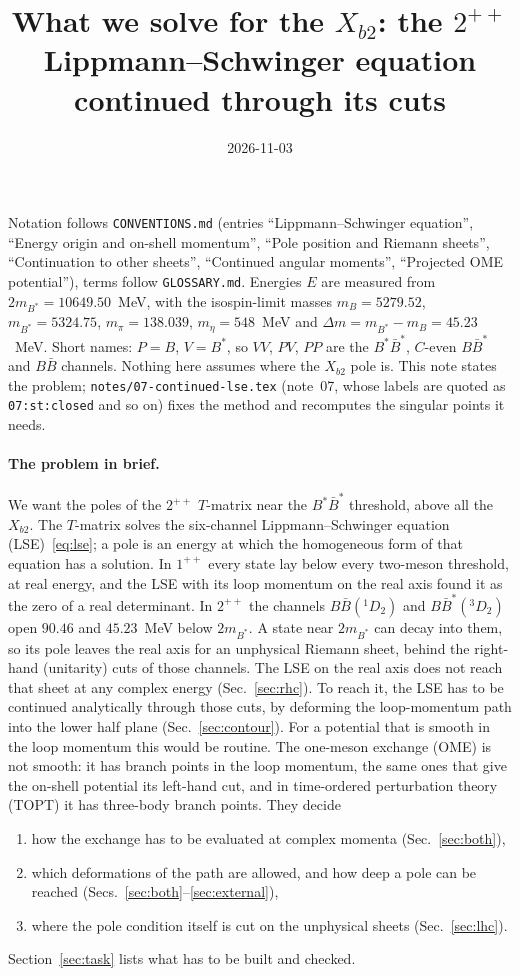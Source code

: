 \documentclass[11pt]{article}
\title{What we solve for the $X_{b2}$: the $2^{++}$ Lippmann--Schwinger equation continued through its cuts}
\author{}
\date{2026-11-03}
\newcommand{\file}[1]{\nolinkurl{#1}}
\begin{document}
\maketitle

\noindent Notation follows \file{CONVENTIONS.md} (entries ``Lippmann--Schwinger equation'', ``Energy origin and on-shell momentum'', ``Pole position and Riemann sheets'', ``Continuation to other sheets'', ``Continued angular moments'', ``Projected OME potential''), terms follow \file{GLOSSARY.md}. Energies $E$ are measured from $2m_{B^*}=10649.50$~MeV, with the isospin-limit masses $m_B=5279.52$, $m_{B^*}=5324.75$, $m_\pi=138.039$, $m_\eta=548$~MeV and $\Delta m=m_{B^*}-m_B=45.23$~MeV. Short names: $P=B$, $V=B^*$, so $VV$, $PV$, $PP$ are the $B^*\bar B^*$, $C$-even $B\bar B^*$ and $B\bar B$ channels. Nothing here assumes where the $X_{b2}$ pole is. This note states the problem; \file{notes/07-continued-lse.tex} (note~07, whose labels are quoted as \texttt{07:st:closed} and so on) fixes the method and recomputes the singular points it needs.

\paragraph{The problem in brief.}
We want the poles of the $2^{++}$ $T$-matrix near the $B^*\bar B^*$ threshold, above all the $X_{b2}$. The $T$-matrix solves the six-channel Lippmann--Schwinger equation (LSE)~\eqref{eq:lse}; a pole is an energy at which the homogeneous form of that equation has a solution. In $1^{++}$ every state lay below every two-meson threshold, at real energy, and the LSE with its loop momentum on the real axis found it as the zero of a real determinant. In $2^{++}$ the channels $B\bar B(^1D_2)$ and $B\bar B^*(^3D_2)$ open $90.46$ and $45.23$~MeV below $2m_{B^*}$. A state near $2m_{B^*}$ can decay into them, so its pole leaves the real axis for an unphysical Riemann sheet, behind the right-hand (unitarity) cuts of those channels. The LSE on the real axis does not reach that sheet at any complex energy (Sec.~\ref{sec:rhc}). To reach it, the LSE has to be continued analytically through those cuts, by deforming the loop-momentum path into the lower half plane (Sec.~\ref{sec:contour}). For a potential that is smooth in the loop momentum this would be routine. The one-meson exchange (OME) is not smooth: it has branch points in the loop momentum, the same ones that give the on-shell potential its left-hand cut, and in time-ordered perturbation theory (TOPT) it has three-body branch points. They decide
\begin{enumerate}
\item how the exchange has to be evaluated at complex momenta (Sec.~\ref{sec:both}),
\item which deformations of the path are allowed, and how deep a pole can be reached (Secs.~\ref{sec:both}--\ref{sec:external}),
\item where the pole condition itself is cut on the unphysical sheets (Sec.~\ref{sec:lhc}).
\end{enumerate}
Section~\ref{sec:task} lists what has to be built and checked.
\end{document}
